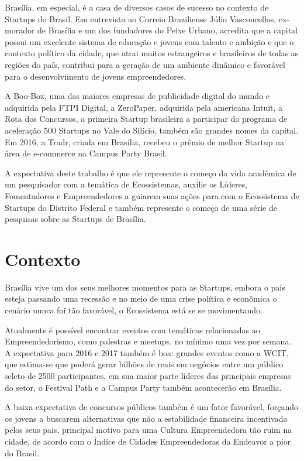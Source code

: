 Brasília, em especial, é a casa de diversos casos de sucesso no contexto de Startups do Brasil. Em entrevista ao Correio Braziliense Júlio Vasconcellos, ex-morador de Brasília e um dos fundadores do Peixe Urbano, acredita que a capital possui um excelente sistema de educação e jovens com talento e ambição e que o contexto político da cidade, que atrai muitos estrangeiros e brasileiros de todas as regiões do país, contribui para a geração de um ambiente dinâmico e favorável para o desenvolvimento de jovens empreendedores. 

A Boo-Box, uma das maiores empresas de publicidade digital do mundo e adquirida pela FTPI Digital, a ZeroPaper, adquirida pela americana Intuit, a Rota dos Concursos, a primeira Startup brasileira a participar do programa de aceleração 500 Startups no Vale do Silício, também são grandes nomes da capital. Em 2016, a Tradr, criada em Brasília, recebeu o prêmio de melhor Startup na área de e-commerce na Campus Party Brasil.

A expectativa deste trabalho é que ele represente o começo da vida acadêmica de um pesquisador com a temática de Ecossistemas, auxilie os Líderes, Fomentadores e Empreendedores a guiarem suas ações para com o Ecossistema de Startups do Distrito Federal e também represente o começo de uma série de pesquisas sobre as Startups de Brasília. 

\section{Contexto}
\label{section:contexto}

Brasília vive um dos seus melhores momentos para as Startups, embora o país esteja passando uma recessão e no meio de uma crise política e econômica o cenário nunca foi tão favorável, o Ecossistema está se se movimentando. 

Atualmente é possível encontrar eventos com temáticas relacionadas ao Empreendedorismo, como palestras e meetups, no mínimo uma vez por semana. A expectativa para 2016 e 2017 também é boa: grandes eventos como a WCIT, que estima-se que poderá gerar bilhões de reais em negócios entre um público seleto de 2500 participantes, em sua maior parte líderes das principais empresas do setor, o Festival Path e a Campus Party também acontecerão em Brasília.

A baixa expectativa de concursos públicos também é um fator favorável, forçando os jovens a buscarem alternativas que não a estabilidade financeira incentivada pelos seus pais, principal motivo para uma Cultura Empreendedora tão ruim na cidade, de acordo com o Índice de Cidades Empreendedoras da Endeavor a pior do Brasil.

